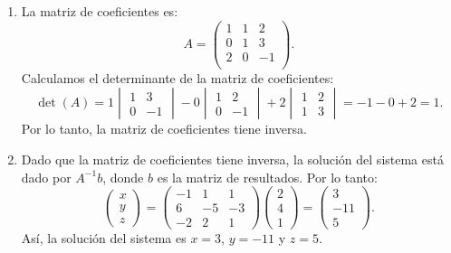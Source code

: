 \documentclass[11pt,respuestas,a4]{aleph-examen}
\begin{document}
\begin{preguntas}
\begin{respuesta}\hspace{0pt}
\begin{enumerate}
\item La matriz de coeficientes es:
    \[
        A = \begin{pmatrix}
            1 & 1 & 2 \\
            0 & 1 & 3 \\
            2 & 0 & -1 \\
        \end{pmatrix}.
    \]
    Calculamos el determinante de la matriz de coeficientes:
    \[
        \det(A) = 1\begin{vmatrix} 1 & 3 \\ 0 & -1 \end{vmatrix} - 0\begin{vmatrix} 1 & 2 \\ 0 & -1 \end{vmatrix} + 2\begin{vmatrix} 1 & 2 \\ 1 & 3 \end{vmatrix} = -1 -0 + 2 = 1.
    \]
    Por lo tanto, la matriz de coeficientes tiene inversa.
\item Dado que la matriz de coeficientes tiene inversa, la solución del sistema está dado por $A^{-1}b$, donde $b$ es la matriz de resultados. Por lo tanto:
\[
    \begin{pmatrix}
        x \\ y \\ z
    \end{pmatrix} = \begin{pmatrix}
        -1 & 1 & 1\\
        6 & -5 & -3\\
        -2 & 2 & 1
    \end{pmatrix}\begin{pmatrix}
        2 \\ 4 \\ 1
    \end{pmatrix} = 
    \begin{pmatrix}
        3 \\ -11 \\ 5
    \end{pmatrix}.
\]
Así, la solución del sistema es $x = 3$, $y = -11$ y $z = 5$. \qedhere
\end{enumerate}
\end{respuesta}

\end{preguntas}
\end{document}
